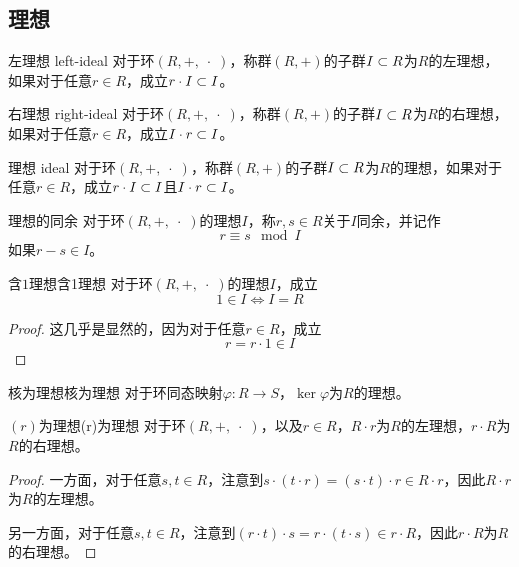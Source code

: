\subsection{理想}

\begin{definition}{左理想 left-ideal}
	对于环$(R,+,\;\cdot\;)$，称群$(R,+)$的子群$I\subset R$为$R$的左理想，如果对于任意$r\in R$，成立$r\cdot I\subset I$。
\end{definition}

\begin{definition}{右理想 right-ideal}
	对于环$(R,+,\;\cdot\;)$，称群$(R,+)$的子群$I\subset R$为$R$的右理想，如果对于任意$r\in R$，成立$I\cdot r\subset I$。
\end{definition}

\begin{definition}{理想 ideal}
	对于环$(R,+,\;\cdot\;)$，称群$(R,+)$的子群$I\subset R$为$R$的理想，如果对于任意$r\in R$，成立$r\cdot I\subset I$且$I\cdot r\subset I$。
\end{definition}

\begin{definition}{理想的同余}
	对于环$(R,+,\;\cdot\;)$的理想$I$，称$r,s\in R$关于$I$同余，并记作%
	$$
	r\equiv s\mod I
	$$
	如果$r-s\in I$。
\end{definition}

\begin{proposition}{含$1$理想}{含1理想}
	对于环$(R,+,\;\cdot\;)$的理想$I$，成立
	$$
	1\in I\iff I=R
	$$
\end{proposition}

\begin{proof}
	这几乎是显然的，因为对于任意$r\in R$，成立
	$$
	r=r\cdot 1\in I
	$$
\end{proof}

\begin{proposition}{核为理想}{核为理想}
	对于环同态映射$\varphi:R\to S$，$\ker\varphi$为$R$的理想。
\end{proposition}

\begin{proposition}{$(r)$为理想}{(r)为理想}
	对于环$(R,+,\;\cdot\;)$，以及$r\in R$，$R\cdot r$为$R$的左理想，$r\cdot R$为$R$的右理想。
\end{proposition}

\begin{proof}
	一方面，对于任意$s,t\in R$，注意到$s\cdot (t\cdot r)=(s\cdot t)\cdot r\in R\cdot r$，因此$R\cdot r$为$R$的左理想。
	
	另一方面，对于任意$s,t\in R$，注意到$(r\cdot t)\cdot s=r\cdot (t\cdot s)\in r\cdot R$，因此$r\cdot R$为$R$的右理想。
\end{proof}

